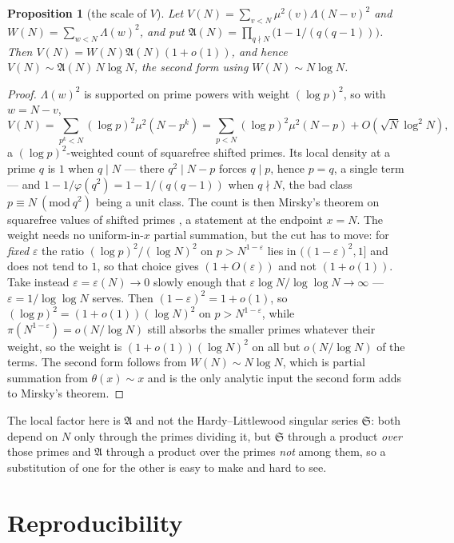 \documentclass[11pt,a4paper]{article}
\theoremstyle{plain}
\newtheorem{proposition}[theorem]{Proposition}
\theoremstyle{definition}
\theoremstyle{remark}
\renewcommand{\SS}{\mathfrak{S}}
\newcommand{\AAA}{\mathfrak{A}}
\begin{document}
\begin{proposition}[the scale of $V$]\label{prop:V}
Let $V(N)=\sum_{v<N}\mu^2(v)\Lambda(N-v)^2$ and
$W(N)=\sum_{w<N}\Lambda(w)^2$, and put
$\AAA(N)=\prod_{q\nmid N}\bigl(1-1/(q(q-1))\bigr)$. Then
$V(N)=W(N)\AAA(N)(1+o(1))$, and hence $V(N)\sim\AAA(N)\,N\log N$, the
second form using $W(N)\sim N\log N$.
\end{proposition}

\begin{proof}
$\Lambda(w)^2$ is supported on prime powers with weight $(\log p)^2$,
so with $w=N-v$,
\[
  V(N)=\sum_{p^k<N}(\log p)^2\mu^2(N-p^k)
      =\sum_{p<N}(\log p)^2\mu^2(N-p)+O(\sqrt N\log^2N),
\]
a $(\log p)^2$-weighted count of squarefree shifted primes. Its local
density at a prime $q$ is $1$ when $q\mid N$ --- there $q^2\mid N-p$
forces $q\mid p$, hence $p=q$, a single term --- and
$1-1/\varphi(q^2)=1-1/(q(q-1))$ when $q\nmid N$, the bad class
$p\equiv N\ (\mathrm{mod}\ q^2)$ being a unit class. The count is then
Mirsky's theorem on squarefree values of shifted primes
\cite{Mir49}, a statement at the endpoint $x=N$. The weight needs no
uniform-in-$x$ partial summation, but the cut has to move: for
\emph{fixed} $\varepsilon$ the ratio $(\log p)^2/(\log N)^2$ on
$p>N^{1-\varepsilon}$ lies in $((1-\varepsilon)^2,1]$ and does not
tend to $1$, so that choice gives $(1+O(\varepsilon))$ and not
$(1+o(1))$. Take instead $\varepsilon=\varepsilon(N)\to0$ slowly
enough that $\varepsilon\log N/\log\log N\to\infty$ ---
$\varepsilon=1/\log\log N$ serves. Then
$(1-\varepsilon)^2=1+o(1)$, so $(\log p)^2=(1+o(1))(\log N)^2$ on
$p>N^{1-\varepsilon}$, while
$\pi(N^{1-\varepsilon})=o(N/\log N)$ still
absorbs the smaller primes whatever their weight, so the weight is
$(1+o(1))(\log N)^2$ on all but $o(N/\log N)$ of the terms. The second
form follows from $W(N)\sim N\log N$, which is partial summation from
$\theta(x)\sim x$ and is the only analytic input the second form adds
to Mirsky's theorem.
\end{proof}

\noindent
The local factor here is $\AAA$ and not the Hardy--Littlewood singular
series $\SS$: both depend on $N$ only through the primes dividing it,
but $\SS$ through a product \emph{over} those primes and $\AAA$ through
a product over the primes \emph{not} among them, so a substitution of
one for the other is easy to make and hard to see.

\section{Reproducibility}\label{sec:repro}
\end{document}
